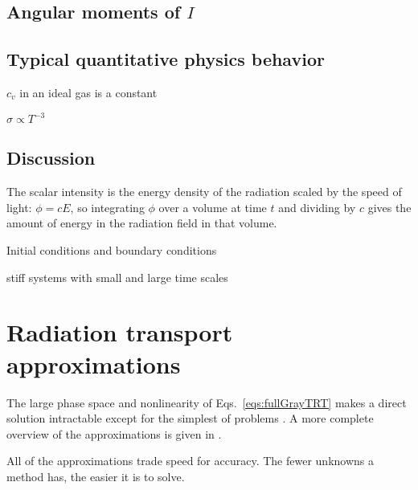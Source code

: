 \subsection{Angular moments of $I$}

\subsection{Typical quantitative physics behavior}
$c_v$ in an ideal gas is a constant

$\sigma \propto T^{-3}$ 

\subsection{Discussion}


The scalar
intensity is the energy density of the radiation scaled by the speed of light:
$\phi=cE$, so integrating $\phi$ over a volume at time $t$ and dividing by $c$
gives the amount of energy in the radiation field in that volume.

Initial conditions and boundary conditions

stiff systems with small and large time scales \cite{Kno2003}

\section{Radiation transport approximations}\label{sec:trtApproxMethods}

The large phase space and nonlinearity of Eqs.~\eqref{eqs:fullGrayTRT} makes a
direct solution intractable except for the simplest of problems
\cite{Su1997,Mos2006}. A more complete overview of the approximations is given
in \cite{Bru2002,Ols2000,Wol2008}.

All of the approximations trade speed for accuracy. The fewer unknowns a method
has, the easier it is to solve.


